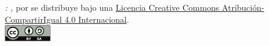 \thispagestyle{empty}

\hfill

\vfill


\noindent\textit{\myTitle: \mySubtitle,} por \myName se distribuye bajo una \href{http://creativecommons.org/licenses/by-sa/4.0/}{Licencia Creative Commons Atribución-CompartirIgual 4.0 Internacional}. \vspace{0.3cm} \\
\noindent\href{http://creativecommons.org/licenses/by-sa/4.0/}{\includegraphics[width=2cm]{gfx/by-sa}}

%
%
%
%
%
